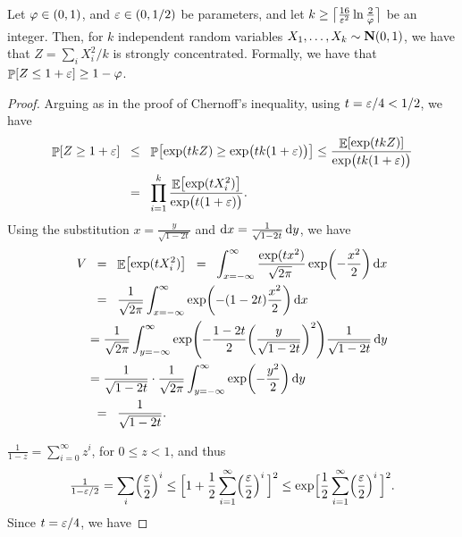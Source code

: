 \begin{lemma}
    Let $\varphi \in (0,1)$, and ${\varepsilon} \in (0,1/2)$ be parameters,
    and let
    $k \geq \left\lceil {\smash{\frac{16}{{\varepsilon}^2} \ln
          \frac{2}{\varphi}}\bigr.} \right\rceil\Bigr.$ be an integer. Then, for
    $k$ independent random variables
    $X_1, \ldots, X_k \sim \NormalY{0}{1}$, we have that
    $Z = \sum_i X_i^2/k$ is strongly concentrated. Formally, we have
    that $\Prob{ Z \leq 1+\eps} \geq 1 - \BadProb$.
\end{lemma}
\begin{proof}
    Arguing as in the proof of Chernoff's inequality, using
    $t={\varepsilon}/4<1/2$, we have
    \begin{align*}
        \Prob{Z \geq 1+\eps}%
        &\LEQ%
        \Prob{\exp(tkZ) \geq \exp\bigl( tk(1+\eps)\bigr)}
        \leq
        \frac{\Ex{\exp(tkZ)}}
        {{\exp\bigl( tk(1+\eps)\bigr)}}
        \\&%
        \EQ%
        \prod_{i=1}^k \frac{\Ex{\exp( tX_i^2) }}
        {\exp\bigl( t(1+\eps)\bigr)}.
    \end{align*}
    Using the substitution $x= \frac{y}{\sqrt{1-2t}}$ and
    $\mathop{}\!\mathrm{d}x = \frac{1}{\sqrt{1-2t}} \mathop{}\!\mathrm{d}y$, we have
    \begin{align*}
        V
        &\EQ
        \Ex{\exp( tX_i^2) }%
      \EQ%
        \int_{x=-\infty}^\infty \frac{\exp(tx^2)}{\mysqrt{2\pi}} \exp
        \pth{ -\frac{x^2}{2}} \diffX{x}%
        \\&
        \EQ%
      \frac{1}{\sqrt{2\pi}}
      \int_{x=-\infty}^\infty \exp
      \pth{ -(1-2t)\frac{x^2}{2}} \diffX{x}%
      \\&%
      =
      \frac{1}{\sqrt{2\pi}}
      \int_{y=-\infty}^{\infty}  \exp
      \pth{ -\frac{1-2t}{2}\pth{\frac{y}{\sqrt{1-2t}}}^2}
      \frac{1}{\sqrt{1-2t}}
      \diffX{y}%
      \\&
      =
      \frac{1}{\sqrt{1-2t}}
      \cdot
      \frac{1}{\sqrt{2\pi}}
      \int_{y=-\infty}^{\infty}  \exp
      \pth{ -\frac{y^2}{2} }
      \diffX{y}%
      \\&
      \EQ%
      \frac{1}{\sqrt{1-2t}}.
    \end{align*}

     $\frac{1}{1-z} = \sum_{i=0}^\infty z^i$, for
    $0 \leq z < 1$, and thus
    \begin{equation*}
        \tfrac{1}{{1-\eps/2}} %
        =%
        \sum_i \pth{\frac{\eps}{2}}^i%
        \leq%
        \Bigl[{1 + \frac{1}{2}\sum_{i=1}^\infty
           \pth{\frac{\eps}{2}}^{i}}\,\Bigr]^2%
        \leq%
        \exp\Bigl[{\frac{1}{2}\sum_{i=1}^\infty
           \pth{\frac{\eps}{2}}^{i}}\,\Bigr]^2.
    \end{equation*}
Since $t={\varepsilon}/4$, we have


\end{proof}
